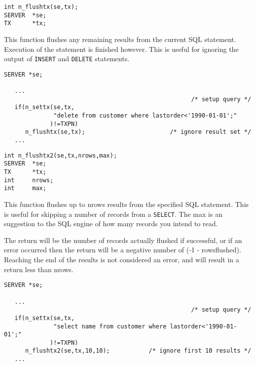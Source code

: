 \SYNOPSIS
\begin{verbatim}
int n_flushtx(se,tx);
SERVER  *se;
TX      *tx;
\end{verbatim}

\DESCRIPTION

This function flushes any remaining results from the current SQL
statement. Execution of the statement is finished however. This
is useful for ignoring the output of \verb`INSERT` and \verb`DELETE` statements.

\EXAMPLE
\begin{verbatim}
SERVER *se;

   ...
                                                     /* setup query */
   if(n_settx(se,tx,
              "delete from customer where lastorder<'1990-01-01';"
             )!=TXPN)
      n_flushtx(se,tx);                        /* ignore result set */
   ...
\end{verbatim}



\SYNOPSIS
\begin{verbatim}
int n_flushtx2(se,tx,nrows,max);
SERVER  *se;
TX      *tx;
int     nrows;
int     max;
\end{verbatim}

\DESCRIPTION

This function flushes up to nrows results from the specified SQL
statement. This is useful for skipping a number of records from
a \verb`SELECT`.  The max is an suggestion to the SQL engine of how many
records you intend to read.

The return will be the number of records actually flushed if
successful, or if an error occurred then the return will be a
negative number of (-1 - rowsflushed).  Reaching the end of the
results is not considered an error, and will result in a return
less than nrows.

\EXAMPLE
\begin{verbatim}
SERVER *se;

   ...
                                                     /* setup query */
   if(n_settx(se,tx,
              "select name from customer where lastorder<'1990-01-01';"
             )!=TXPN)
      n_flushtx2(se,tx,10,10);           /* ignore first 10 results */
   ...
\end{verbatim}



